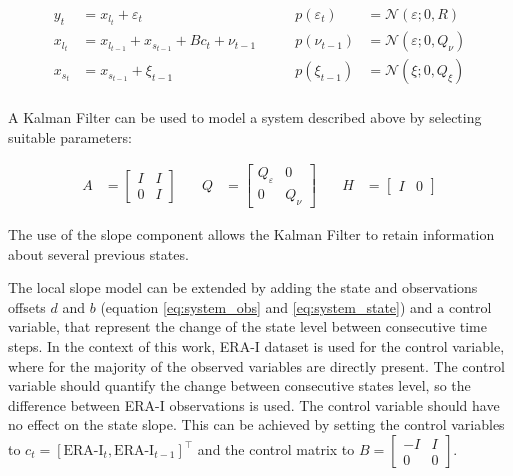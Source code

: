 \documentclass{article}
\newcommand{\norm}[3]{\mathcal{N}\left(#1; #2, #3\right)} %
\begin{document}
\begin{equation*}
   \begin{alignedat}{2}
    y_t &= x_{l_t} + \varepsilon_t & p(\varepsilon_t) \quad &= \norm{\varepsilon}{0}{R}\\
    x_{l_t} &= x_{l_{t-1}} + x_{s_{t-1}} + Bc_t + \nu_{t-1} \quad \quad & p(\nu_{t-1}) &= \norm{\varepsilon}{0}{Q_\nu}\\
    x_{s_t} &= x_{s_{t-1}} + \xi_{t-1} \quad & p(\xi_{t-1}) &= \norm{\xi}{0}{Q_\xi} \\
    \end{alignedat} 
\end{equation*}

A Kalman Filter can be used to model a system described above by selecting suitable parameters:

\begin{equation*}\label{eq:local_slope}
\begin{alignedat}{3}
    A &= \begin{bmatrix}I & I \\ 0 & I\end{bmatrix} \quad & Q &= \begin{bmatrix}Q_\varepsilon & 0 \\ 0 & Q_\nu \end{bmatrix}  \quad & H &= \begin{bmatrix}I & 0 \end{bmatrix}
\end{alignedat} 
\end{equation*}

The use of the slope component allows the Kalman Filter to retain information about several previous states.

The local slope model can be extended by adding the state and observations offsets $d$ and $b$ (equation \ref{eq:system_obs} and \ref{eq:system_state}) and a control variable, that represent the change of the state level between consecutive time steps.
In the context of this work, ERA-I dataset is used for the control variable, where for the majority of the observed variables are directly present. The control variable should quantify the change between consecutive states level, so the difference between ERA-I observations is used. The control variable should have no effect on the state slope. This can be achieved by setting the control variables to $c_t = [\text{ERA-I}_t, \text{ERA-I}_{t-1}]^\top$ and the control matrix to $B = \begin{bmatrix}-I & I \\ 0 & 0\end{bmatrix}$.
\end{document}
